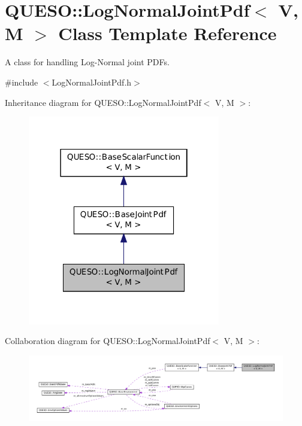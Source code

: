 \hypertarget{class_q_u_e_s_o_1_1_log_normal_joint_pdf}{\section{Q\-U\-E\-S\-O\-:\-:Log\-Normal\-Joint\-Pdf$<$ V, M $>$ Class Template Reference}
\label{class_q_u_e_s_o_1_1_log_normal_joint_pdf}
}


A class for handling Log-\/\-Normal joint P\-D\-Fs.  




{\ttfamily \#include $<$Log\-Normal\-Joint\-Pdf.\-h$>$}



Inheritance diagram for Q\-U\-E\-S\-O\-:\-:Log\-Normal\-Joint\-Pdf$<$ V, M $>$\-:
\nopagebreak
\begin{figure}[H]
\begin{center}
\leavevmode
\includegraphics[width=238pt]{class_q_u_e_s_o_1_1_log_normal_joint_pdf__inherit__graph}
\end{center}
\end{figure}


Collaboration diagram for Q\-U\-E\-S\-O\-:\-:Log\-Normal\-Joint\-Pdf$<$ V, M $>$\-:
\nopagebreak
\begin{figure}[H]
\begin{center}
\leavevmode
\includegraphics[width=350pt]{class_q_u_e_s_o_1_1_log_normal_joint_pdf__coll__graph}
\end{center}
\end{figure}
